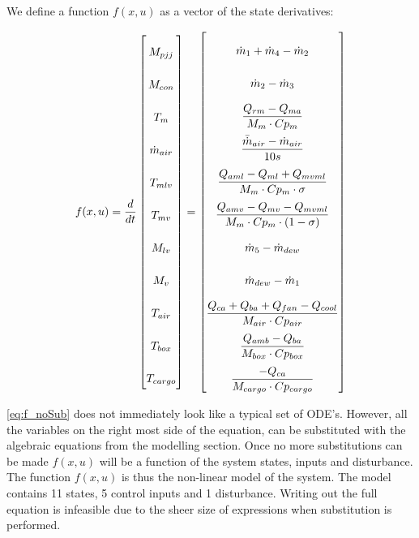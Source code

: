 We define a function $f(x,u)$ as a vector of the state derivatives:

\begin{equation} \label{eq:f_noSub} \renewcommand{\arraystretch}{2.4}
	f(x,u) =  \dfrac{d}{dt} \begin{bmatrix}
		M_{pjj}			\\				%
		M_{con} 		\\				%
		T_m 			\\				%
		\dot{m}_{air}	\\				%
		T_{mlv}			\\				%
		T_{mv}			\\				%
		M_{lv}			\\				%
		M_v				\\				%
		T_{air}			\\				%
		T_{box}			\\				%
		T_{cargo}		\\				%

	\end{bmatrix}
	=
	\begin{bmatrix}
		\dot{m}_1 + \dot{m}_4 - \dot{m}_2 \\										%
		\dot{m}_{2} - \dot{m}_{3}	\\												%
		\dfrac{Q_{rm} - Q_{ma}}{M_m \cdot Cp_m} \\									%
		\dfrac{\bar{\dot{m}}_{air}  - \dot{m}_{air}} {10s}		\\					%
		\dfrac{Q_{aml}-Q_{ml} + Q_{mvml}}{M_m \cdot Cp_m \cdot \sigma}        \\	%
		\dfrac{Q_{amv} - Q_{mv} - Q_{mvml}}{M_m \cdot Cp_m \cdot (1- \sigma)}	\\	%
		\dot{m}_{5} - \dot{m}_{dew}		\\											%
		\dot{m}_{dew} - \dot{m}_{1}	\\												%
		\dfrac{Q_{ca} + Q_{ba} + Q_{fan} -Q_{cool}}{M_{air} \cdot Cp_{air}} \\		%
		\dfrac{Q_{amb} - Q_{ba}}{M_{box} \cdot Cp_{box}} \\							%
		\dfrac{-Q_{ca}}{M_{cargo} \cdot Cp_{cargo}}									%
	\end{bmatrix}
\end{equation}

\cref{eq:f_noSub} does not immediately look like a typical set of ODE's. However, all the variables on the right most side of the equation, can be substituted with the algebraic equations from the modelling section. Once no more substitutions can be made $f(x,u)$ will be a function of the system states, inputs and disturbance. The function $f(x,u)$ is thus the non-linear model of the system. The model contains 11 states, 5 control inputs and 1 disturbance. Writing out the full equation is infeasible due to the sheer size of expressions when substitution is performed.

